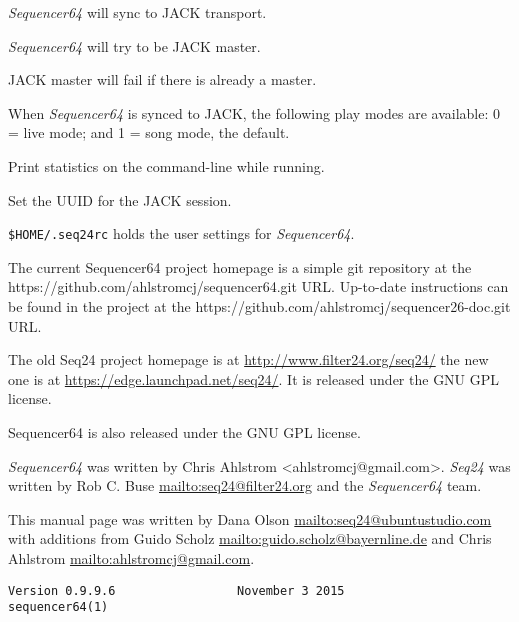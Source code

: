       \textsl{Sequencer64} will sync to JACK transport.

      \textsl{Sequencer64} will try to be JACK master.

      JACK master will fail if there is already a master.

      When \textsl{Sequencer64} is synced to JACK, the following play modes
      are available: 0 = live mode; and 1 = song mode, the default.

      Print statistics on the command-line while running.

      Set the UUID for the JACK session.

   \texttt{\$HOME/.seq24rc} holds the user settings for \textsl{Sequencer64}.

   The current Sequencer64 project homepage is a simple git repository at the
   https://github.com/ahlstromcj/sequencer64.git URL.
   Up-to-date instructions can be found in the project at the
   https://github.com/ahlstromcj/sequencer26-doc.git URL.

   The old Seq24 project homepage is at
   \url{http://www.filter24.org/seq24/} the new
   one is at \url{https://edge.launchpad.net/seq24/}.
   It is released under the GNU GPL license.

   Sequencer64 is also released under the GNU GPL license.

   \textsl{Sequencer64} was written by Chris Ahlstrom <ahlstromcj@gmail.com>.
   \textsl{Seq24} was written by Rob C. Buse \url{mailto:seq24@filter24.org}
   and the \textsl{Sequencer64} team.

   This manual page was written by Dana Olson
   \url{mailto:seq24@ubuntustudio.com} with additions from Guido Scholz
   \url{mailto:guido.scholz@bayernline.de} and Chris Ahlstrom
   \url{mailto:ahlstromcj@gmail.com}.

   \begin{verbatim}
Version 0.9.9.6                 November 3 2015                  sequencer64(1)
   \end{verbatim}

